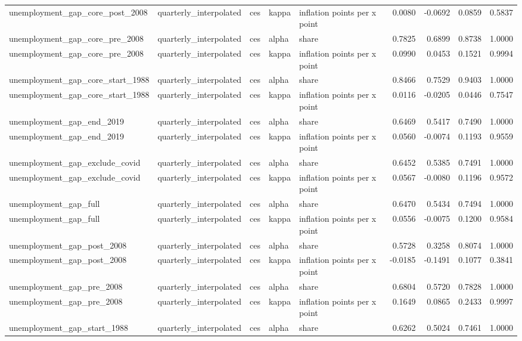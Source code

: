 \begin{tabular}{lllllrrrr}
unemployment\_gap\_core\_post\_2008 & quarterly\_interpolated & ces & kappa & inflation points per x point & 0.0080 & -0.0692 & 0.0859 & 0.5837 \\
unemployment\_gap\_core\_pre\_2008 & quarterly\_interpolated & ces & alpha & share & 0.7825 & 0.6899 & 0.8738 & 1.0000 \\
unemployment\_gap\_core\_pre\_2008 & quarterly\_interpolated & ces & kappa & inflation points per x point & 0.0990 & 0.0453 & 0.1521 & 0.9994 \\
unemployment\_gap\_core\_start\_1988 & quarterly\_interpolated & ces & alpha & share & 0.8466 & 0.7529 & 0.9403 & 1.0000 \\
unemployment\_gap\_core\_start\_1988 & quarterly\_interpolated & ces & kappa & inflation points per x point & 0.0116 & -0.0205 & 0.0446 & 0.7547 \\
unemployment\_gap\_end\_2019 & quarterly\_interpolated & ces & alpha & share & 0.6469 & 0.5417 & 0.7490 & 1.0000 \\
unemployment\_gap\_end\_2019 & quarterly\_interpolated & ces & kappa & inflation points per x point & 0.0560 & -0.0074 & 0.1193 & 0.9559 \\
unemployment\_gap\_exclude\_covid & quarterly\_interpolated & ces & alpha & share & 0.6452 & 0.5385 & 0.7491 & 1.0000 \\
unemployment\_gap\_exclude\_covid & quarterly\_interpolated & ces & kappa & inflation points per x point & 0.0567 & -0.0080 & 0.1196 & 0.9572 \\
unemployment\_gap\_full & quarterly\_interpolated & ces & alpha & share & 0.6470 & 0.5434 & 0.7494 & 1.0000 \\
unemployment\_gap\_full & quarterly\_interpolated & ces & kappa & inflation points per x point & 0.0556 & -0.0075 & 0.1200 & 0.9584 \\
unemployment\_gap\_post\_2008 & quarterly\_interpolated & ces & alpha & share & 0.5728 & 0.3258 & 0.8074 & 1.0000 \\
unemployment\_gap\_post\_2008 & quarterly\_interpolated & ces & kappa & inflation points per x point & -0.0185 & -0.1491 & 0.1077 & 0.3841 \\
unemployment\_gap\_pre\_2008 & quarterly\_interpolated & ces & alpha & share & 0.6804 & 0.5720 & 0.7828 & 1.0000 \\
unemployment\_gap\_pre\_2008 & quarterly\_interpolated & ces & kappa & inflation points per x point & 0.1649 & 0.0865 & 0.2433 & 0.9997 \\
unemployment\_gap\_start\_1988 & quarterly\_interpolated & ces & alpha & share & 0.6262 & 0.5024 & 0.7461 & 1.0000 \\

\end{tabular}
